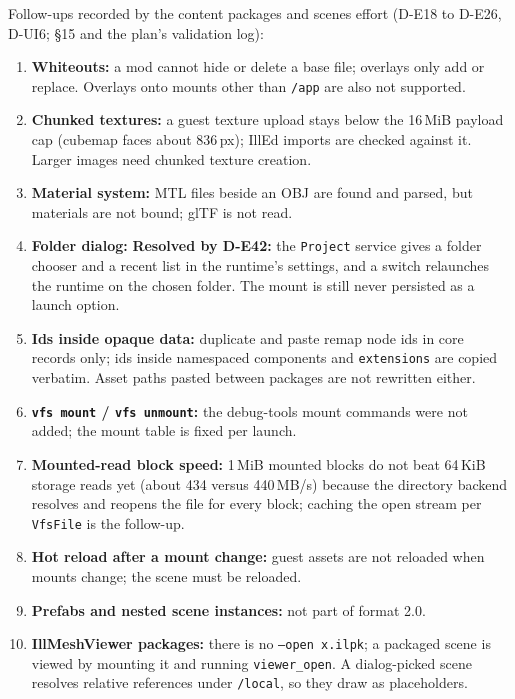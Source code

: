 Follow-ups recorded by the content packages and scenes effort (D-E18 to
D-E26, D-UI6;  \S15 and
the plan's validation log):

\begin{openbox}
\begin{enumerate}
  \item \textbf{Whiteouts:} a mod cannot hide or delete a base file; overlays
        only add or replace. Overlays onto mounts other than \texttt{/app} are
        also not supported.
  \item \textbf{Chunked textures:} a guest texture upload stays below the
        16\,MiB payload cap (cubemap faces about 836\,px); IllEd imports are
        checked against it. Larger images need chunked texture creation.
  \item \textbf{Material system:} MTL files beside an OBJ are found and parsed,
        but materials are not bound; glTF is not read.
  \item \textbf{Folder dialog:} \textbf{Resolved by D-E42:} the
        \texttt{Project} service gives a folder chooser and a recent list in
        the runtime's settings, and a switch relaunches the runtime on the
        chosen folder. The mount is still never persisted as a launch option.
  \item \textbf{Ids inside opaque data:} duplicate and paste remap node ids in
        core records only; ids inside namespaced components and
        \texttt{extensions} are copied verbatim. Asset paths pasted between
        packages are not rewritten either.
  \item \textbf{\texttt{vfs mount} / \texttt{vfs unmount}:} the debug-tools
        mount commands were not added; the mount table is fixed per launch.
  \item \textbf{Mounted-read block speed:} 1\,MiB mounted blocks do not beat
        64\,KiB storage reads yet (about 434 versus 440\,MB/s) because the
        directory backend resolves and reopens the file for every block;
        caching the open stream per \texttt{VfsFile} is the follow-up.
  \item \textbf{Hot reload after a mount change:} guest assets are not
        reloaded when mounts change; the scene must be reloaded.
  \item \textbf{Prefabs and nested scene instances:} not part of format 2.0.
  \item \textbf{IllMeshViewer packages:} there is no \texttt{--open x.ilpk};
        a packaged scene is viewed by mounting it and running
        \texttt{viewer\_open}. A dialog-picked scene resolves relative
        references under \texttt{/local}, so they draw as placeholders.
\end{enumerate}
\end{openbox}
